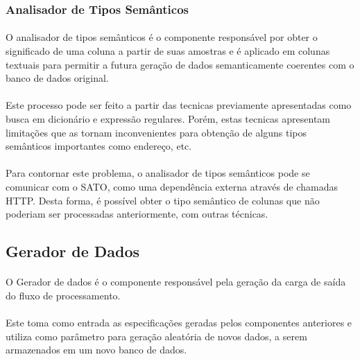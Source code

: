 \subsubsection{Analisador de Tipos Semânticos}

\paragraph{} O analisador de tipos semânticos é o componente responsável por obter o significado de uma coluna a partir de suas amostras e é aplicado em colunas textuais para permitir a futura geração de dados semanticamente coerentes com o banco de dados original.

\paragraph{} Este processo pode ser feito a partir das tecnicas previamente apresentadas como busca em dicionário e expressão regulares. Porém, estas tecnicas apresentam limitações que as tornam inconvenientes para obtenção de alguns tipos semânticos importantes como endereço, etc.

\paragraph{} Para contornar este problema, o analisador de tipos semânticos pode se comunicar com o SATO, como uma dependência externa através de chamadas HTTP. Desta forma, é possível obter o tipo semântico de colunas que não poderiam ser processadas anteriormente, com outras técnicas.

\subsection{Gerador de Dados}

\paragraph{} O Gerador de dados é o componente responsável pela geração da carga de saída do fluxo de processamento. 

\paragraph{} Este toma como entrada as especificações geradas pelos componentes anteriores e utiliza como parâmetro para geração aleatória de novos dados, a serem armazenados em um novo banco de dados.

